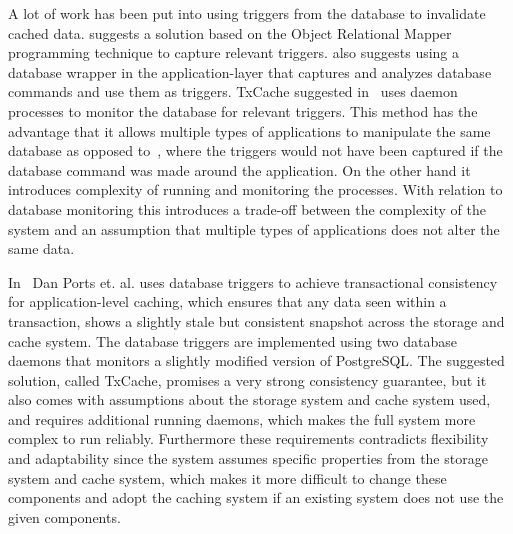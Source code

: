 A lot of work has been put into using triggers from the database to invalidate cached data. \cite{paper:cache-genie} suggests a solution based on the Object Relational Mapper programming technique to capture relevant triggers. \cite{paper:deploy-time} also suggests using a database wrapper in the application-layer that captures and analyzes database commands and use them as triggers. TxCache suggested in~\cite{paper:liskov} uses daemon processes to monitor the database for relevant triggers. This method has the advantage that it allows multiple types of applications to manipulate the same database as opposed to~\cite{paper:cache-genie, paper:deploy-time}, where the triggers would not have been captured if the database command was made around the application. On the other hand it introduces complexity of running and monitoring the processes. With relation to database monitoring this introduces a trade-off between the complexity of the system and an assumption that multiple types of applications does not alter the same data.


In~\cite{paper:liskov} Dan Ports et. al. uses database triggers to achieve transactional consistency for application-level caching, which ensures that any data seen within a transaction, shows a slightly stale but consistent snapshot across the storage and cache system. The database triggers are implemented using two database daemons that monitors a slightly modified version of PostgreSQL. The suggested solution, called TxCache, promises a very strong consistency guarantee, but it also comes with assumptions about the storage system and cache system used, and requires additional running daemons, which makes the full system more complex to run reliably. Furthermore these requirements contradicts flexibility and adaptability since the system assumes specific properties from the storage system and cache system, which makes it more difficult to change these components and adopt the caching system if an existing system does not use the given components.

